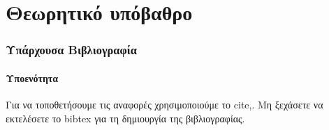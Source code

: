 

\chapter{Θεωρητικό υπόβαθρο}

\subsection{Υπάρχουσα Βιβλιογραφία}
\subsubsection{Υποενότητα}
Για να τοποθετήσουμε τις αναφορές χρησιμοποιούμε το cite\cite{greekbook},\cite{dcis2011}. Μη ξεχάσετε να εκτελέσετε το bibtex για τη δημιουργία της βιβλιογραφίας.
\clearpage
